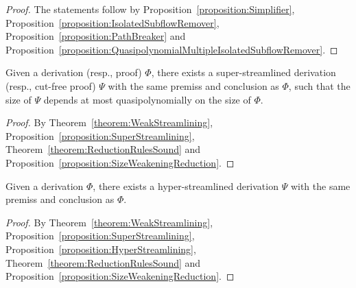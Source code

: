 \begin{proof}
The statements follow by Proposition~\vref{proposition:Simplifier}, Proposition~\vref{proposition:IsolatedSubflowRemover}, Proposition~\vref{proposition:PathBreaker} and Proposition~\vref{proposition:QuasipolynomialMultipleIsolatedSubflowRemover}.
\end{proof}

\begin{corollary}\label{corollary:SuperStreamlining}
Given a derivation (resp., proof)\/ $\Phi$, there exists a super-streamlined derivation (resp., cut-free proof)\/ $\Psi$ with the same premiss and conclusion as\/ $\Phi$, such that the size of\/ $\Psi$ depends at most quasipolynomially on the size of\/ $\Phi$.
\end{corollary}

\begin{proof}
By Theorem~\ref{theorem:WeakStreamlining}, Proposition~\vref{proposition:SuperStreamlining}, Theorem~\vref{theorem:ReductionRulesSound} and Proposition~\vref{proposition:SizeWeakeningReduction}.
\end{proof}

\begin{corollary}\label{corollary:HyperStreamlining}
Given a derivation\/ $\Phi$, there exists a hyper-streamlined derivation\/ $\Psi$ with the same premiss and conclusion as\/ $\Phi$.
\end{corollary}

\begin{proof}
By Theorem~\ref{theorem:WeakStreamlining}, Proposition~\vref{proposition:SuperStreamlining}, Proposition~\vref{proposition:HyperStreamlining}, Theorem~\vref{theorem:ReductionRulesSound} and Proposition~\vref{proposition:SizeWeakeningReduction}.
\end{proof}
